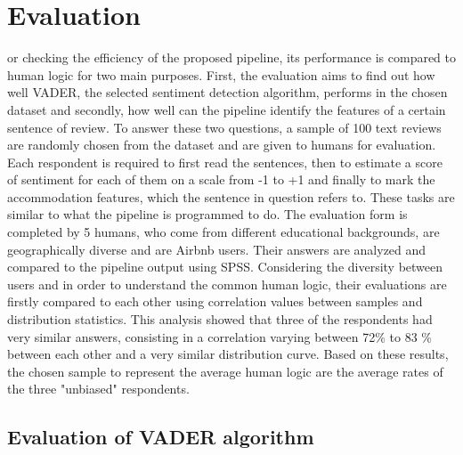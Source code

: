 %
%


\let\textcircled=\pgftextcircled
\chapter{Evaluation}
\label{chap:eva}


or checking the efficiency of the proposed pipeline, its performance is compared to human  logic for two main purposes. First, the evaluation aims to find out how well VADER, the selected sentiment detection algorithm, performs in the chosen dataset and secondly, how well can the pipeline identify the features of a certain sentence of review. To answer these two questions, a sample of 100 text reviews  are randomly chosen from the dataset and are given to humans for evaluation. Each respondent is required to first read the sentences, then to estimate a score of sentiment for each of them on a scale from -1 to +1 and finally to mark the accommodation features, which the sentence in question refers to. These tasks are similar to what the pipeline is programmed to do. 
The evaluation form is completed by 5 humans, who come from different educational backgrounds, are geographically diverse and are Airbnb users. Their answers are analyzed and compared to the pipeline output using SPSS. Considering the diversity between users and in order to understand the common human logic, their evaluations are firstly compared to each other using correlation values between samples and distribution statistics. This analysis showed that three of the respondents had very similar answers, consisting in a correlation varying between 72\% to 83 \% between each other and a very similar distribution curve. 
Based on these results, the chosen sample to represent the average human logic are the average rates of the three "unbiased"  respondents. 

\section{Evaluation of VADER algorithm}

